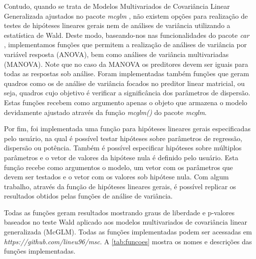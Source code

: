 Contudo, quando se trata de Modelos Multivariados de Covariância Linear Generalizada ajustados no pacote \emph{mcglm} \citep{mcglm}, não existem opções para realização de testes de hipóteses lineares gerais nem de análises de variância utilizando a estatística de Wald. Deste modo, baseando-nos nas funcionalidades do pacote \emph{car} \citep{car}, implementamos funções que permitem a realização de análises de variância por variável resposta (ANOVA), bem como análises de variância multivariadas (MANOVA). Note que no caso da MANOVA os preditores devem ser iguais para todas as respostas sob análise. Foram implementadas também funções que geram quadros como os de análise de variância focados no preditor linear matricial, ou seja, quadros cujo objetivo é verificar a significância dos parâmetros de dispersão. Estas funções recebem como argumento apenas o objeto que armazena o modelo devidamente ajustado através da função \emph{mcglm()} do pacote \emph{mcglm}.

Por fim, foi implementada uma função para hipóteses lineares gerais especificadas pelo usuário, na qual é possível testar hipóteses sobre parâmetros de regressão, dispersão ou potência. Também é possível especificar hipóteses sobre múltiplos parâmetros e o vetor de valores da hipótese nula é definido pelo usuário. Esta função recebe como argumentos o modelo, um vetor com os parâmetros que devem ser testados e o vetor com os valores sob hipótese nula. Com algum trabalho, através da função de hipóteses lineares gerais, é possível replicar os resultados obtidos pelas funções de análise de variância.

Todas as funções geram resultados mostrando graus de liberdade e p-valores baseados no teste Wald aplicado aos modelos multivariados de covariância linear generalizada (McGLM). Todas as funções implementadas podem ser acessadas em \emph{https://github.com/lineu96/msc}. A \autoref{tab:funcoes} mostra os nomes e descrições das funções implementadas.

